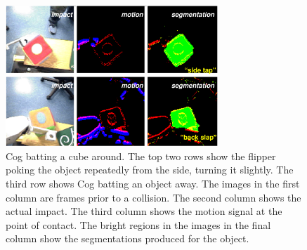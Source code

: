 %
\begin{figure}[tb]
\begin{center}
\includegraphics[width=8cm]{segmentation-detail.eps}
\caption{ 
\label{fig:poking-segmentation}
%
Cog batting a cube around.  The top two rows show the flipper poking
the object repeatedly from the side, turning it slightly.  The third
row shows Cog batting an object away.  The images in the first column
are frames prior to a collision.  The second column shows the actual
impact.  The third column shows the motion signal at the point of
contact.  The bright regions in the images in the final column show
the segmentations produced for the object. 
%
}
\end{center}
\end{figure}
%

